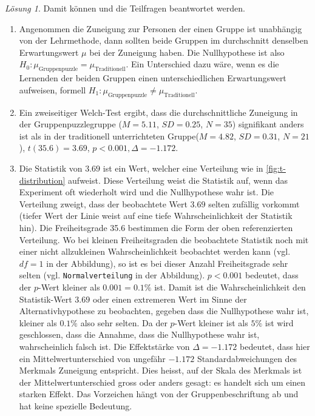 \documentclass[
]{book}
\providecommand{\tightlist}{%
  \setlength{\itemsep}{0pt}\setlength{\parskip}{0pt}}
\theoremstyle{definition}
\theoremstyle{definition}
\theoremstyle{definition}
\theoremstyle{definition}
\theoremstyle{remark}
\newtheorem*{solution}{Lösung}
\begin{document}
\begin{solution}
Damit können und die Teilfragen beantwortet werden.

\begin{enumerate}
\def\labelenumi{\alph{enumi})}
\tightlist
\item
  Angenommen die Zuneigung zur Personen der einen Gruppe ist unabhängig von der Lehrmethode, dann sollten beide Gruppen im durchschnitt denselben Erwartungswert \(\mu\) bei der Zuneigung haben. Die Nullhypothese ist also \(H_0: \mu_\text{Gruppenpuzzle} = \mu_\text{Traditionell}\). Ein Unterschied dazu wäre, wenn es die Lernenden der beiden Gruppen einen unterschiedlichen Erwartungswert aufweisen, formell \(H_1: \mu_\text{Gruppenpuzzle} \neq \mu_\text{Traditionell}\).
\item
  Ein zweiseitiger Welch-Test ergibt, dass die durchschnittliche Zuneigung in der Gruppenpuzzlegruppe (\(M = 5.11\), \(SD = 0.25\), \(N = 35\)) signifikant anders ist als in der traditionell unterrichteten Gruppe(\(M = 4.82\), \(SD = 0.31\), \(N = 21\)), \(t(35.6) = 3.69\), \(p < 0.001, \Delta = -1.172\).
\item
  Die Statistik von \(3.69\) ist ein Wert, welcher eine Verteilung wie in \ref{fig:t-distribution} aufweist. Diese Verteilung weist die Statistik auf, wenn das Experiment oft wiederholt wird und die Nullhypothese wahr ist. Die Verteilung zweigt, dass der beobachtete Wert \(3.69\) selten zufällig vorkommt (tiefer Wert der Linie weist auf eine tiefe Wahrscheinlichkeit der Statistik hin). Die Freiheitsgrade 35.6 bestimmen die Form der oben referenzierten Verteilung. Wo bei kleinen Freiheitsgraden die beobachtete Statistik noch mit einer nicht allzukleinen Wahrscheinlichkeit beobachtet werden kann (vgl. \(df = 1\) in der Abbildung), so ist es bei dieser Anzahl Freiheitsgrade sehr selten (vgl. \texttt{Normalverteilung} in der Abbildung). \(p < 0.001\) bedeutet, dass der \(p\)-Wert kleiner als \(0.001 = 0.1\%\) ist. Damit ist die Wahrscheinlichkeit den Statistik-Wert \(3.69\) oder einen extremeren Wert im Sinne der Alternativhypothese zu beobachten, gegeben dass die Nullhypothese wahr ist, kleiner als \(0.1\%\) also sehr selten. Da der \(p\)-Wert kleiner ist als \(5\%\) ist wird geschlossen, dass die Annahme, dass die Nullhypothese wahr ist, wahrscheinlich falsch ist. Die Effektstärke von \(\Delta = -1.172\) bedeutet, dass hier ein Mittelwertunterschied von ungefähr \(-1.172\) Standardabweichungen des Merkmals Zuneigung entspricht. Dies heisst, auf der Skala des Merkmals ist der Mittelwertunterschied gross oder anders gesagt: es handelt sich um einen starken Effekt. Das Vorzeichen hängt von der Gruppenbeschriftung ab und hat keine spezielle Bedeutung.
\end{enumerate}

\end{solution}
\end{document}
